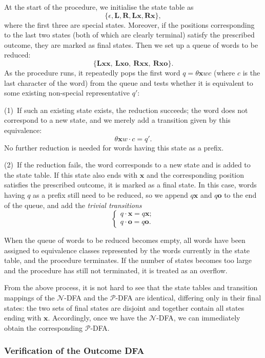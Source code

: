 \documentclass[11pt]{article}
\theoremstyle{definition}
\theoremstyle{plain}
\newcommand{\varP}{\mathcal{P}}
\newcommand{\varN}{\mathcal{N}}
\newcommand{\rmL}{\mathbf{L}}
\newcommand{\rmR}{\mathbf{R}}
\newcommand{\x}{\mathbf{x}}
\newcommand{\e}{\mathbf{o}}
\begin{document}
At the start of the procedure, we initialise the state table as
\[
    \{\epsilon, \rmL, \rmR, \rmL\x, \rmR\x\},
\]
where the first three are special states. Moreover, if the positions corresponding to the last two states (both of which are clearly terminal) satisfy the prescribed outcome, they are marked as final states.
Then we set up a queue of words to be reduced:
\[
    \{\rmL\x\x,\ \rmL\x\e,\ \rmR\x\x,\ \rmR\x\e\}.
\]
As the procedure runs, it repeatedly pops the first word $q=\theta\x wc$ (where $c$ is the last character of the word) from the queue and tests whether it is equivalent to some existing non-special representative $q'$:

(1)~If such an existing state exists, the reduction succeeds; the word does not correspond to a new state, and we merely add a transition given by this equivalence:
\[
    \theta\x w \cdot c = q'.
\]
No further reduction is needed for words having this state as a prefix.

(2)~If the reduction fails, the word corresponds to a new state and is added to the state table. If this state also ends with $\x$ and the corresponding position satisfies the prescribed outcome, it is marked as a final state.
In this case, words having $q$ as a prefix still need to be reduced, so we append $q\x$ and $q\e$ to the end of the queue, and add the \textit{trivial transitions}
\[
    \begin{cases}
        q\cdot \x = q\x; \\
        q\cdot \e = q\e.
    \end{cases}
\]

When the queue of words to be reduced becomes empty, all words have been assigned to equivalence classes represented by the words currently in the state table, and the procedure terminates.
If the number of states becomes too large and the procedure has still not terminated, it is treated as an overflow.

From the above process, it is not hard to see that the state tables and transition mappings of the $\varN$-DFA and the $\varP$-DFA are identical, differing only in their final states: the two sets of final states are disjoint and together contain all states ending with $\x$.
Accordingly, once we have the $\varN$-DFA, we can immediately obtain the corresponding $\varP$-DFA.

\subsubsection{Verification of the Outcome DFA}
\end{document}
